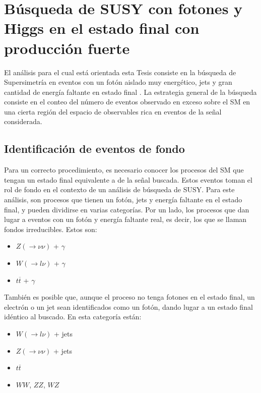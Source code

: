 \chapter{Búsqueda de SUSY con fotones y Higgs en el estado final con producción fuerte}


El análisis para el cual está orientada esta Tesis consiste en la búsqueda de Supersimetría en eventos con un fotón aislado muy energético, jets y gran cantidad de energía faltante en estado final \cite{Alonso:2147473,ATLAS:2016fks,Collaboration:2198651}. La estrategia general de la búsqueda consiste en el conteo del número de eventos observado en exceso sobre el SM en una cierta región del espacio de observables rica en eventos de la señal considerada.


\section{Identificación de eventos de fondo}

Para un correcto procedimiento, es necesario conocer los procesos del SM que tengan un estado final equivalente a de la señal buscada. Estos eventos toman el rol de fondo en el contexto de un análisis de búsqueda de SUSY. Para este análisis, son procesos que tienen un fotón, jets y energía faltante en el estado final, y pueden dividirse en varias categorías. Por un lado, los procesos que dan lugar a eventos con un fotón y energía faltante real, es decir, los que se llaman fondos irreducibles. Estos son:

\begin{itemize}

	\item $Z(\rightarrow \nu\nu)$ + $\gamma$

	\item $W (\rightarrow l\nu)$ + $\gamma$

	\item $t \overline{t}$ + $\gamma$

\end{itemize}

También es posible que, aunque el proceso no tenga fotones en el estado final, un electrón o un jet sean identificados como un fotón, dando lugar a un estado final idéntico al buscado. En esta categoría están:

\begin{itemize}

	\item $W (\rightarrow l\nu)$ + jets

	\item $Z (\rightarrow \nu\nu)$ + jets

	\item $t \overline{t}$

	\item $WW$, $ZZ$, $WZ$

\end{itemize}

